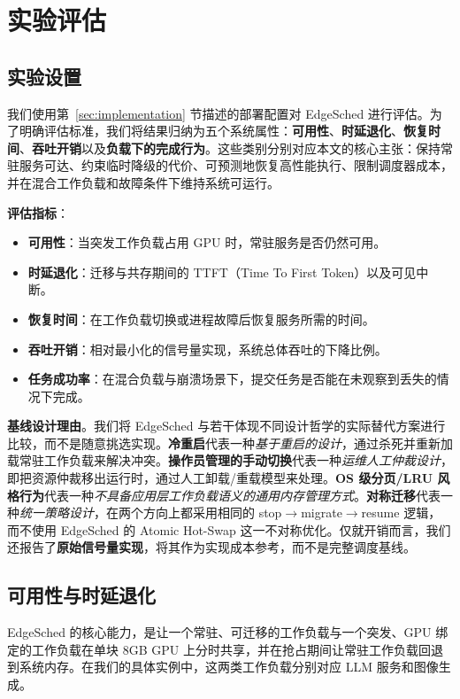 \section{实验评估}

\subsection{实验设置}

我们使用第~\ref{sec:implementation} 节描述的部署配置对 EdgeSched 进行评估。为了明确评估标准，我们将结果归纳为五个系统属性：\textbf{可用性}、\textbf{时延退化}、\textbf{恢复时间}、\textbf{吞吐开销}以及\textbf{负载下的完成行为}。这些类别分别对应本文的核心主张：保持常驻服务可达、约束临时降级的代价、可预测地恢复高性能执行、限制调度器成本，并在混合工作负载和故障条件下维持系统可运行。

\textbf{评估指标}：
\begin{itemize}
\item \textbf{可用性}：当突发工作负载占用 GPU 时，常驻服务是否仍然可用。
\item \textbf{时延退化}：迁移与共存期间的 TTFT（Time To First Token）以及可见中断。
\item \textbf{恢复时间}：在工作负载切换或进程故障后恢复服务所需的时间。
\item \textbf{吞吐开销}：相对最小化的信号量实现，系统总体吞吐的下降比例。
\item \textbf{任务成功率}：在混合负载与崩溃场景下，提交任务是否能在未观察到丢失的情况下完成。
\end{itemize}

\textbf{基线设计理由}。我们将 EdgeSched 与若干体现不同设计哲学的实际替代方案进行比较，而不是随意挑选实现。\textbf{冷重启}代表一种\emph{基于重启的设计}，通过杀死并重新加载常驻工作负载来解决冲突。\textbf{操作员管理的手动切换}代表一种\emph{运维人工仲裁设计}，即把资源仲裁移出运行时，通过人工卸载/重载模型来处理。\textbf{OS 级分页/LRU 风格行为}代表一种\emph{不具备应用层工作负载语义的通用内存管理方式}。\textbf{对称迁移}代表一种\emph{统一策略设计}，在两个方向上都采用相同的 stop$\rightarrow$migrate$\rightarrow$resume 逻辑，而不使用 EdgeSched 的 Atomic Hot-Swap 这一不对称优化。仅就开销而言，我们还报告了\textbf{原始信号量实现}，将其作为实现成本参考，而不是完整调度基线。

\subsection{可用性与时延退化}

EdgeSched 的核心能力，是让一个常驻、可迁移的工作负载与一个突发、GPU 绑定的工作负载在单块 8GB GPU 上分时共享，并在抢占期间让常驻工作负载回退到系统内存。在我们的具体实例中，这两类工作负载分别对应 LLM 服务和图像生成。

